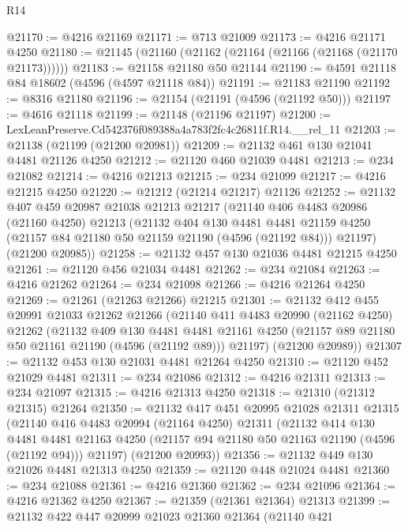\begin{lexlean}{R14}
\begin{coremodule}
@21170 := @4216 @21169
@21171 := @713 @21009
@21173 := @4216 @21171 @4250
@21180 := @21145 (@21160 (@21162 (@21164 (@21166 (@21168 (@21170 @21173))))))
@21183 := @21158 @21180 @50 @21144
@21190 := @4591 @21118 @84 @18602 (@4596 (@4597 @21118 @84))
@21191 := @21183 @21190
@21192 := @8316 @21180
@21196 := @21154 (@21191 (@4596 (@21192 @50)))
@21197 := @4616 @21118
@21199 := @21148 (@21196 @21197)
@21200 := LexLeanPreserve.Cd542376f089388a4a783f2fc4c26811f.R14.__rel_11
@21203 := @21138 (@21199 (@21200 @20981))
@21209 := @21132 @461 @130 @21041 @4481 @21126 @4250
@21212 := @21120 @460 @21039 @4481
@21213 := @234 @21082
@21214 := @4216 @21213
@21215 := @234 @21099
@21217 := @4216 @21215 @4250
@21220 := @21212 (@21214 @21217) @21126
@21252 := @21132
    @407
    @459
    @20987
    @21038
    @21213
    @21217
    (@21140
      @406
      @4483
      @20986
      (@21160 @4250)
      @21213
      (@21132
        @404
        @130
        @4481
        @4481
        @21159
        @4250
        (@21157 @84 @21180 @50 @21159 @21190 (@4596 (@21192 @84)))
        @21197)
      (@21200 @20985))
@21258 := @21132 @457 @130 @21036 @4481 @21215 @4250
@21261 := @21120 @456 @21034 @4481
@21262 := @234 @21084
@21263 := @4216 @21262
@21264 := @234 @21098
@21266 := @4216 @21264 @4250
@21269 := @21261 (@21263 @21266) @21215
@21301 := @21132
    @412
    @455
    @20991
    @21033
    @21262
    @21266
    (@21140
      @411
      @4483
      @20990
      (@21162 @4250)
      @21262
      (@21132
        @409
        @130
        @4481
        @4481
        @21161
        @4250
        (@21157 @89 @21180 @50 @21161 @21190 (@4596 (@21192 @89)))
        @21197)
      (@21200 @20989))
@21307 := @21132 @453 @130 @21031 @4481 @21264 @4250
@21310 := @21120 @452 @21029 @4481
@21311 := @234 @21086
@21312 := @4216 @21311
@21313 := @234 @21097
@21315 := @4216 @21313 @4250
@21318 := @21310 (@21312 @21315) @21264
@21350 := @21132
    @417
    @451
    @20995
    @21028
    @21311
    @21315
    (@21140
      @416
      @4483
      @20994
      (@21164 @4250)
      @21311
      (@21132
        @414
        @130
        @4481
        @4481
        @21163
        @4250
        (@21157 @94 @21180 @50 @21163 @21190 (@4596 (@21192 @94)))
        @21197)
      (@21200 @20993))
@21356 := @21132 @449 @130 @21026 @4481 @21313 @4250
@21359 := @21120 @448 @21024 @4481
@21360 := @234 @21088
@21361 := @4216 @21360
@21362 := @234 @21096
@21364 := @4216 @21362 @4250
@21367 := @21359 (@21361 @21364) @21313
@21399 := @21132
    @422
    @447
    @20999
    @21023
    @21360
    @21364
    (@21140
      @421

\end{coremodule}
\end{lexlean}
